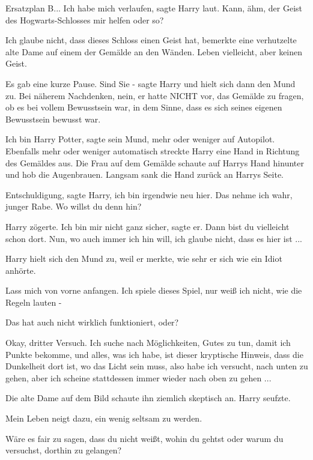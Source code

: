 Ersatzplan B... \glqq{}Ich habe mich verlaufen\grqq{}, sagte Harry laut. \glqq
Kann, ähm, der Geist des Hogwarts-Schlosses mir helfen oder so?\grqq{}

\glqq{}Ich glaube nicht, dass dieses Schloss einen Geist hat\grqq{}, bemerkte
eine verhutzelte alte Dame auf einem der Gemälde an den Wänden. \glqq{}Leben
vielleicht, aber keinen Geist.\grqq{}

Es gab eine kurze Pause. \glqq{}Sind Sie -\grqq{} sagte Harry und hielt sich dann
den Mund zu. Bei näherem Nachdenken, nein, er hatte NICHT vor, das Gemälde zu
fragen, ob es bei vollem Bewusstsein war, in dem Sinne, dass es sich seines
eigenen Bewusstsein bewusst war.

\glqq{}Ich bin Harry Potter\grqq{}, sagte sein Mund, mehr oder weniger auf
Autopilot. Ebenfalls mehr oder weniger automatisch streckte Harry eine Hand in
Richtung des Gemäldes aus. Die Frau auf dem Gemälde schaute auf Harrys Hand
hinunter und hob die Augenbrauen. Langsam sank die Hand zurück an Harrys Seite.

\glqq{}Entschuldigung\grqq{}, sagte Harry, \glqq{}ich bin irgendwie neu
hier.\grqq{} \glqq{}Das nehme ich wahr, junger Rabe. Wo willst du denn
hin?\grqq{}

Harry zögerte. \glqq{}Ich bin mir nicht ganz sicher\grqq{}, sagte er. \glqq{}Dann
bist du vielleicht schon dort.\grqq{} \glqq{}Nun, wo auch immer ich hin will, ich
glaube nicht, dass es hier ist ...\grqq{}

Harry hielt sich den Mund zu, weil er merkte, wie sehr er sich wie ein Idiot
anhörte.

\glqq{}Lass mich von vorne anfangen. Ich spiele dieses Spiel, nur weiß ich nicht,
wie die Regeln lauten -\grqq{}

Das hat auch nicht wirklich funktioniert, oder?

\glqq{}Okay, dritter Versuch. Ich suche nach Möglichkeiten, Gutes zu tun, damit
ich Punkte bekomme, und alles, was ich habe, ist dieser kryptische Hinweis, dass
die Dunkelheit dort ist, wo das Licht sein muss, also habe ich versucht, nach
unten zu gehen, aber ich scheine stattdessen immer wieder nach oben zu gehen
...\grqq{}

Die alte Dame auf dem Bild schaute ihn ziemlich skeptisch an. Harry seufzte.

\glqq{}Mein Leben neigt dazu, ein wenig seltsam zu werden.\grqq{}

\glqq{}Wäre es fair zu sagen, dass du nicht weißt, wohin du gehtst oder warum du
versuchst, dorthin zu gelangen?\grqq{}

